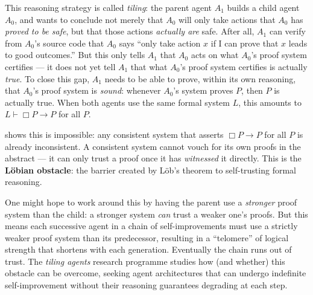 \documentclass[11pt]{article}
\begin{document}
\begin{exercise}
\begin{remark}
\medskip
\noindent
This reasoning strategy is called \emph{tiling}: the parent agent $A_1$ builds a
child agent $A_0$, and wants to conclude not merely that $A_0$ will only take actions
that $A_0$ has \emph{proved to be safe}, but that those actions \emph{actually are}
safe. After all, $A_1$ can verify from $A_0$'s source code that $A_0$ says ``only
take action $x$ if I can prove that $x$ leads to good outcomes.'' But this only tells
$A_1$ that $A_0$ acts on what $A_0$'s proof system certifies --- it does not yet tell
$A_1$ that what $A_0$'s proof system certifies is actually \emph{true}. To close this
gap, $A_1$ needs to be able to prove, within its own reasoning, that $A_0$'s proof
system is \emph{sound}: whenever $A_0$'s system proves $P$, then $P$ is actually
true. When both agents use the same formal system $L$, this amounts to
$L \vdash \Box P \to P$ for all $P$.

\medskip
\noindent
{} shows this is impossible: any consistent system that asserts
$\Box P \to P$ for all $P$ is already inconsistent. A consistent system cannot vouch
for its own proofs in the abstract --- it can only trust a proof once it has
\emph{witnessed} it directly. This is the \textbf{L\"obian obstacle}: the barrier
created by L\"ob's theorem to self-trusting formal reasoning.

\medskip
\noindent
One might hope to work around this by having the parent use a \emph{stronger} proof
system than the child: a stronger system \emph{can} trust a weaker one's proofs. But
this means each successive agent in a chain of self-improvements must use a strictly
weaker proof system than its predecessor, resulting in a ``telomere'' of logical
strength that shortens with each generation. Eventually the chain runs out of trust.
The \emph{tiling agents} research programme studies how (and whether) this obstacle can
be overcome, seeking agent architectures that can undergo indefinite self-improvement
without their reasoning guarantees degrading at each step.
\end{remark}
\end{exercise}
\end{document}
